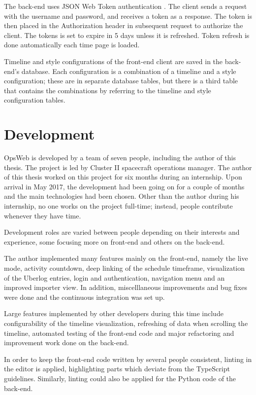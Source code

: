 The back-end uses JSON Web Token authentication \cite{jwt}. The client sends a request with the username and password, and receives a token as a response. The token is then placed in the Authorization header in subsequent request to authorize the client. The tokens is set to expire in 5 days unless it is refreshed. Token refresh is done automatically each time page is loaded.

Timeline and style configurations of the front-end client are saved in the back-end's database. Each configuration is a combination of a timeline and a style configuration; these are in separate database tables, but there is a third table that contains the combinations by referring to the timeline and style configuration tables.

\section{Development}
OpsWeb is developed by a team of seven people, including the author of this thesis. The project is led by Cluster II spacecraft operations manager. The author of this thesis worked on this project for six months during an internship. Upon arrival in May 2017, the development had been going on for a couple of months and the main technologies had been chosen. Other than the author during his internship, no one works on the project full-time; instead, people contribute whenever they have time.

Development roles are varied between people depending on their interests and experience, some focusing more on front-end and others on the back-end. 

The author implemented many features mainly on the front-end, namely the live mode, activity countdown, deep linking of the schedule timeframe, visualization of the Uberlog entries, login and authentication, navigation menu and an improved importer view. In addition, miscelllaneous improvements and bug fixes were done and the continuous integration was set up. 

Large features implemented by other developers during this time include configurability of the timeline visualization, refreshing of data when scrolling the timeline, automated testing of the front-end code and major refactoring and improvement work done on the back-end.

In order to keep the front-end code written by several people consistent, linting in the editor is applied, highlighting parts which deviate from the TypeScript guidelines. Similarly, linting could also be applied for the Python code of the back-end.

